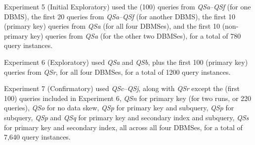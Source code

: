 \documentclass[prodmode,acmtods]{acmsmall}
\begin{document}
Experiment 5 (Initial Exploratory) used the (100) queries from {\em
  QSa}--{\em QSf} (for
one DBMS), the first 20 queries from {\em QSa}--{\em QSf} (for another DBMS), the first
10 (primary key) queries from {\em QSa} (for all four DBMSes), and the first 10
(non-primary key) queries from {\em QSa} (for the other two DBMSes), for a total of 780 query instances.

Experiment 6 (Exploratory) used {\em QSa} and {\em QSb}, plus the first 100 (primary
key) queries from {\em QSr}, for all four DBMSes, for a total of 1200 query
instances. 

Experiment 7 (Confirmatory) used {\em QSc}--{\em QSj}, 
along with {\em QSr} except the (first 100) queries included in Experiment 6, 
{\em QSn} for primary key (for two runs, or 220 queries), 
{\em QSo} for no data skew, 
{\em QSp} for primary key and subquery, 
{\em QSp} for subquery, 
{\em QSp} and {\em QSq} for primary key and secondary index and subquery, 
{\em QSs} for primary key and secondary index, 
all across all four DBMSes, for a total of 7,640 query instances.

\end{document}
